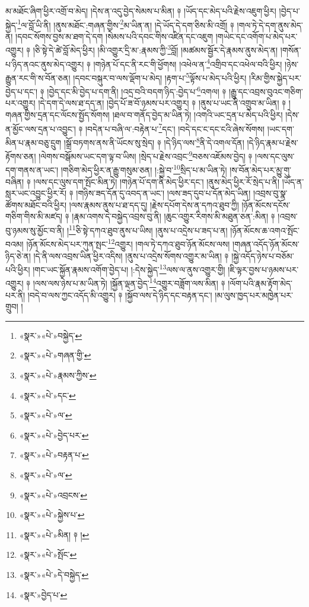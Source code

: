 མ་མཐོང་ཞིག་ཕྱིར་འགྲོ་བ་མེད། །དེས་ན་འདུ་བྱེད་སེམས་པ་མིན། ༈ །ཡོད་དང་མེད་པའི་རྗེས་འཇུག་ཕྱིར། །བྱེད་པ་སྐྱེད་\footnote{«སྣར་»«པེ་»བསྐྱེད་}ལ་བློ་ཡི་ནི། །ནུས་མཐོང་:གཞན་གྱིས་\footnote{«སྣར་»«པེ་»གཞན་གྱི་}མ་ཡིན་ན། །དེ་ཡོད་དེ་དག་ཅིས་མི་འགྲོ། ༈ །གལ་ཏེ་དེ་དག་ནུས་མེད་ན། །དབང་སོགས་བྱས་མ་ཐག་དེ་དག །སེམས་པའི་དབང་གིས་འཛིན་དང་འཇུག །གཡེང་དང་འགོག་པ་མེད་པར་འགྱུར། ༈ །ཅི་སྟེ་དེ་ཚེ་བློ་མེད་ཕྱིར། །མི་འགྱུར་དྲི་མ་:རྣམས་ཀྱི་\footnote{«སྣར་»«པེ་»རྣམས་ཀྱིས་}བློ། །མཚམས་སྦྱོར་དེ་རྣམས་ནུས་མེད་ན། །གསོན་པ་ཉིད་ནའང་ནུས་མེད་འགྱུར། ༈ །གཉེན་པོ་དང་ནི་རང་གི་ཕྱོགས། །འཕེལ་ན་\footnote{«སྣར་»«པེ་»དང་}འགྲིབ་དང་འཕེལ་བའི་ཕྱིར། །ཉེས་རྒྱུན་རང་གི་ས་བོན་ཅན། །དབང་བསྐུར་བ་ལས་ལྡོག་པ་མེད། །རྟག་པ་\footnote{«སྣར་»«པེ་»ལ་}ལྟོས་པ་མེད་པའི་ཕྱིར། །རིམ་གྱིས་སྐྱེད་པར་བྱེད་པ་དང་། ༈ །བྱེད་དང་མི་བྱེད་པ་དག་ནི། །འདྲ་བའི་བདག་ཉིད་:བྱེད་པ་\footnote{«སྣར་»«པེ་»བྱེད་པར་}འགལ། ༈ །རྒྱུ་དང་འབྲས་བུའང་གཅིག་པར་འགྱུར། །དེ་དག་དེ་ལས་ཐ་དད་ན། །བྱེད་པོ་ཟ་བོ་ཉམས་པར་འགྱུར། ༈ །ནུས་པ་ཡང་ནི་འགྲུབ་མ་ཡིན། ༈ །གཞན་གྱིས་དྲན་དང་ལོངས་སྤྱོད་སོགས། །ཐལ་བ་གནོད་བྱེད་མ་ཡིན་ཏེ། །འགའི་ཡང་དྲན་པ་མེད་པའི་ཕྱིར། །དེས་ན་མྱོང་ལས་དྲན་པ་འབྱུང་། ༈ །བདེན་པ་བཞི་ལ་:བརྟེན་པ་\footnote{«སྣར་»«པེ་»བརྟན་པ་}དང་། །བདེ་དང་ང་དང་ངའི་ཞེས་སོགས། །ཡང་དག་མིན་པ་རྣམ་བཅུ་དྲུག །སྒྲོ་བཏགས་ནས་ནི་ཡོངས་སུ་སྲེད། ༈ །དེ་ཉིད་ལས་\footnote{«སྣར་»«པེ་»ལ་}ནི་དེ་འགལ་དོན། །དེ་ཉིད་རྣམ་པ་རྗེས་རྟོགས་ཅན། །ལེགས་བསྒོམས་ཡང་དག་ལྟ་བ་ཡིས། །སྲེད་པ་རྗེས་འབྲང་\footnote{«སྣར་»«པེ་»འབྲངས་}བཅས་འཇོམས་བྱེད། ༈ །ལས་དང་ལུས་དག་གནས་ན་ཡང་། །གཅིག་མེད་ཕྱིར་ན་རྒྱུ་གསུམ་ཅན། །:སྐྱེ་བ་\footnote{«སྣར་»«པེ་»སྐྱེས་པ་}སྲིད་པ་མ་ཡིན་ཏེ། །ས་བོན་མེད་པར་མྱུ་གུ་བཞིན། ༈ །ལས་དང་ལུས་དག་སྤོང་མིན་ཏེ། །གཉེན་པོ་དག་ནི་མེད་ཕྱིར་དང་། །ནུས་མེད་ཕྱིར་རོ་སྲེད་པ་ནི། །ཡོད་ན་སླར་ཡང་འབྱུང་ཕྱིར་རོ། ༈ །གཉིས་ཟད་དོན་དུ་འབད་ན་ཡང་། །ལས་ཟད་དུབ་པ་དོན་མེད་ཡིན། །འབྲས་བུ་སྣ་ཚོགས་མཐོང་བའི་ཕྱིར། །ལས་རྣམས་ནུས་པ་ཐ་དད་དུ། །རྗེས་དཔོག་དེས་ན་དཀའ་ཐུབ་ཀྱི། །ཉོན་མོངས་དངོས་གཅིག་གིས་མི་མཛད། ༈ །རྣམ་འགས་དེ་བསྐྱེད་འབྲས་བུ་ནི། །ཆུང་འགྱུར་རིགས་མི་མཐུན་ཅན་:མིན། ༈ །འབྲས་བུ་ཉམས་སུ་མྱོང་བ་ནི། །\footnote{«སྣར་»«པེ་»མིན། ༈ །}ཅི་སྟེ་དཀའ་ཐུབ་ནུས་པ་ཡིས། །ནུས་པ་འདྲེས་པ་ཟད་པ་ན། །ཉོན་མོངས་ཆ་འགའ་སྤོང་བའམ། །ཉོན་མོངས་མེད་པར་ཀུན་སྤང་\footnote{«སྣར་»«པེ་»སྤོང་}འགྱུར། །གལ་ཏེ་དཀའ་ཐུབ་ཉོན་མོངས་ལས། །གཞན་འདོད་ཉོན་མོངས་ཉིད་ཅེ་ན། །དེ་ནི་ལས་འབྲས་ཡིན་ཕྱིར་འདིས། །ནུས་པ་འདྲེས་སོགས་འགྱུར་མ་ཡིན། ༈ །སྐྱེ་འདོད་ཉེས་པ་བཅོམ་པའི་ཕྱིར། །གང་ཡང་སྐྱོན་རྣམས་འགོག་བྱེད་པ། །:དེས་སྐྱེད་\footnote{«སྣར་»«པེ་»དེ་བསྐྱེད་}ལས་ལ་ནུས་འགྱུར་གྱི། །ཇི་ལྟར་བྱས་པ་ཉམས་པར་འགྱུར། ༈ །ལས་ལས་ཉེས་པ་མ་ཡིན་ཏེ། །སྐྱོན་ལྡན་བྱེད་\footnote{«སྣར་»བྱེད་པ་}འགྱུར་བཟློག་ལས་མིན། ༈ །ལོག་པའི་རྣམ་རྟོག་མེད་པར་ནི། །བདེ་བ་ལས་ཀྱང་འདོད་མི་འགྱུར། ༈ །སྐྱོབ་ལས་དེ་ཉིད་དང་བརྟན་དང་། །མ་ལུས་ཁྱད་པར་མཁྱེན་པར་གྲུབ། །
